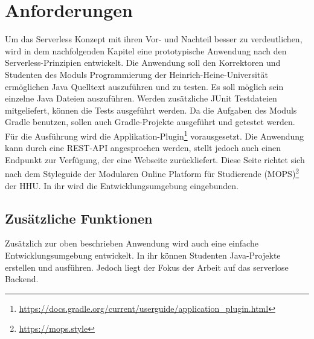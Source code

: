 \chapter{Anforderungen}
Um das Serverless Konzept mit ihren Vor- und Nachteil
besser zu verdeutlichen, wird in dem nachfolgenden Kapitel
eine prototypische Anwendung nach den Serverless-Prinzipien
entwickelt. Die Anwendung soll den Korrektoren und Studenten
des Moduls Programmierung der Heinrich-Heine-Universität
ermöglichen Java Quelltext auszuführen und zu testen.
Es soll möglich sein einzelne Java Dateien auszuführen.
Werden zusätzliche JUnit Testdateien mitgeliefert,
können die Tests ausgeführt werden.
Da die Aufgaben des Moduls Gradle benutzen,
sollen auch Gradle-Projekte ausgeführt und getestet werden.
Für die Ausführung wird die
Applikation-Plugin\footnote{\url{https://docs.gradle.org/current/userguide/application_plugin.html}}
vorausgesetzt.
Die Anwendung kann durch eine REST-API angesprochen werden,
stellt jedoch auch einen Endpunkt zur Verfügung, der eine Webseite zurückliefert.
Diese Seite richtet sich nach dem Styleguide der
Modularen Online Platform für Studierende (MOPS)\footnote{\url{https://mops.style}}
der HHU. In ihr wird die Entwicklungsumgebung eingebunden.

\section{Zusätzliche Funktionen}
Zusätzlich zur oben beschrieben Anwendung
wird auch eine einfache Entwicklungsumgebung entwickelt.
In ihr können Studenten Java-Projekte erstellen und ausführen.
Jedoch liegt der Fokus der Arbeit auf das serverlose Backend.